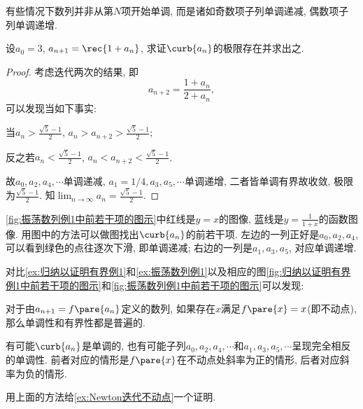 \documentclass{ctexart}
\begin{document}
有些情况下数列并非从第$N$项开始单调, 而是诸如奇数项子列单调递减, 偶数项子列单调递增.
\begin{sample}
    \begin{ex}
        \label{ex:振荡数列例1}
        设$a_0 = 3$, $\displaystyle a_{n+1} = \rec{1+a_n}$, 求证$\curb{a_n}$的极限存在并求出之.
    \end{ex}
    \begin{proof}
        考虑迭代两次的结果, 即
        \[ a_{n+2} = \frac{1+a_n}{2+a_n}, \]
        可以发现当如下事实:
        \begin{cenum}
            \item 当$\displaystyle a_n > \frac{\sqrt{5}-1}{2}$, $\displaystyle a_n > a_{n+2} > \frac{\sqrt{5}-1}{2}$;
            \item 反之若$\displaystyle a_n < \frac{\sqrt{5}-1}{2}$, $\displaystyle a_n < a_{n+2} < \frac{\sqrt{5}-1}{2}$.
        \end{cenum}
        故$a_0, a_2, a_4, \cdots$单调递减, $a_1 = 1/4, a_3, a_5, \cdots$单调递增, 二者皆单调有界故收敛, 极限为$\displaystyle \frac{\sqrt{5}-1}{2}$. 知$\displaystyle \lim_{n\rightarrow\infty} a_n = \frac{\sqrt{5}-1}{2}$.
    \end{proof}
\end{sample}
\cref{fig:振荡数列例1中前若干项的图示}中红线是$y=x$的图像, 蓝线是$\displaystyle y=\frac{1}{1+x}$的函数图像. 用图中的方法可以做图找出$\curb{a_n}$的前若干项. 左边的一列正好是$a_0, a_2, a_4$, 可以看到绿色的点往逐次下滑, 即单调递减; 右边的一列是$a_1, a_3, a_5$, 对应单调递增.
\par
对比\cref{ex:归纳以证明有界例1}和\cref{ex:振荡数列例1}以及相应的图\cref{fig:归纳以证明有界例1中前若干项的图示}和\cref{fig:振荡数列例1中前若干项的图示}可以发现:
\begin{cenum}
    \item 对于由$a_{n+1} = f\pare{a_n}$定义的数列, 如果存在$x$满足$f\pare{x} = x$(即不动点), 那么单调性和有界性都是普遍的.
    \item 有可能$\curb{a_n}$是单调的, 也有可能子列$a_0, a_2, a_4, \cdots$和$a_1, a_3, a_5,\cdots$呈现完全相反的单调性. 前者对应的情形是$f\pare{x}$在不动点处斜率为正的情形, 后者对应斜率为负的情形.
\end{cenum}
\begin{sample}
    \begin{ex}
        \label{ex:Newton迭代单调方法}
        用上面的方法给\cref{ex:Newton迭代不动点}一个证明.
    \end{ex}
\end{sample}
\end{document}
